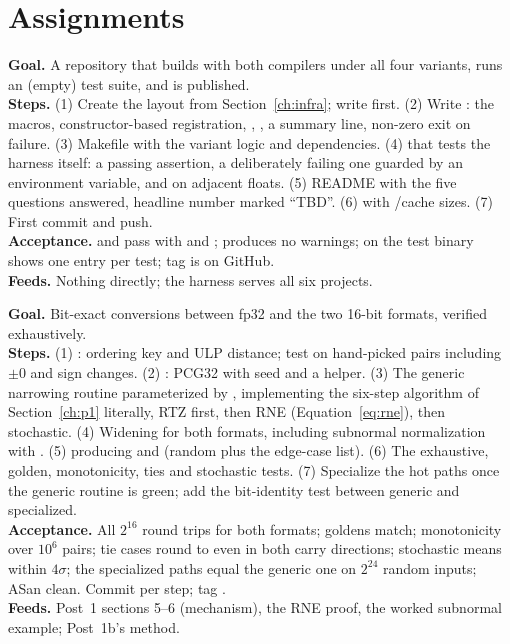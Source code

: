 \section{Assignments}

\textbf{Goal.} A repository that builds with both compilers under all four  variants, runs an (empty) test suite, and is published.\\
\textbf{Steps.} (1) Create the layout from Section~\ref{ch:infra}; write  first. (2) Write : the macros, constructor-based registration, , , a summary line, non-zero exit on failure. (3) Makefile with the variant logic and  dependencies. (4)  that tests the harness itself: a passing assertion, a deliberately failing one guarded by an environment variable, and  on adjacent floats. (5) README with the five questions answered, headline number marked ``TBD''. (6)  with /cache sizes. (7) First commit and push.\\
\textbf{Acceptance.}  and  pass with  and ;  produces no warnings;  on the test binary shows one entry per test; tag  is on GitHub.\\
\textbf{Feeds.} Nothing directly; the harness serves all six projects.

\textbf{Goal.} Bit-exact conversions between fp32 and the two 16-bit formats, verified exhaustively.\\
\textbf{Steps.} (1) : ordering key and ULP distance; test on hand-picked pairs including $\pm 0$ and sign changes. (2) : PCG32 with seed and a  helper. (3) The generic narrowing routine parameterized by , implementing the six-step algorithm of Section~\ref{ch:p1} literally, RTZ first, then RNE (Equation~\eqref{eq:rne}), then stochastic. (4) Widening for both formats, including subnormal normalization with . (5)  producing  and  (random plus the edge-case list). (6) The exhaustive, golden, monotonicity, ties and stochastic tests. (7) Specialize the hot paths once the generic routine is green; add the bit-identity test between generic and specialized.\\
\textbf{Acceptance.} All $2^{16}$ round trips for both formats; goldens match; monotonicity over $10^6$ pairs; tie cases round to even in both carry directions; stochastic means within $4\sigma$; the specialized paths equal the generic one on $2^{24}$ random inputs; ASan clean. Commit per step; tag .\\
\textbf{Feeds.} Post~1 sections 5--6 (mechanism), the RNE proof, the worked subnormal example; Post~1b's method.

